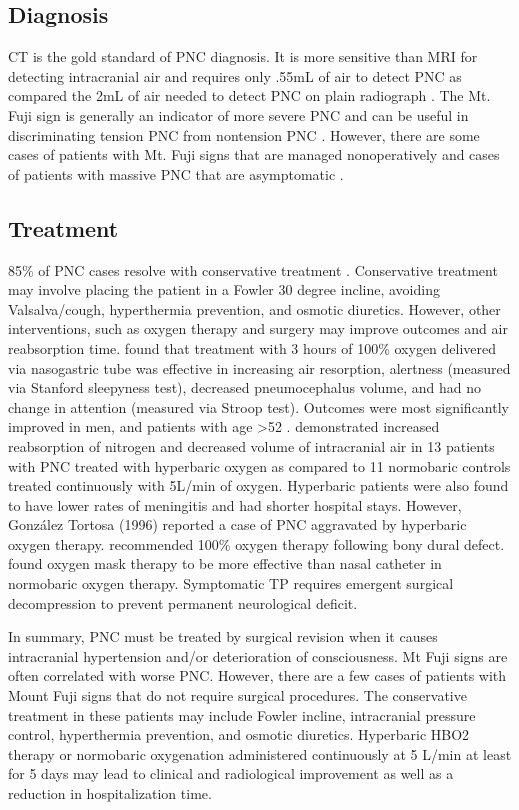 \documentclass[fleqn,10pt]{olplainarticle}
\begin{document}
\subsection*{Diagnosis}
CT is the gold standard of PNC diagnosis. It is more sensitive than MRI for detecting intracranial air and requires only .55mL of air to detect PNC as compared the 2mL of air needed to detect PNC on plain radiograph \citep{pmid24305016}. The Mt. Fuji sign is generally an indicator of more severe PNC and can be useful in discriminating tension PNC from nontension PNC \citep{pmid15286317}. However, there are some cases of patients with Mt. Fuji signs that are managed nonoperatively and cases of patients with massive PNC that are asymptomatic \citep{pmid7142505}.

\subsection*{Treatment}
85\% of PNC cases resolve with conservative treatment \citep{pmid24305016}. Conservative treatment may involve placing the patient in a Fowler 30 degree incline, avoiding Valsalva/cough, hyperthermia prevention, and osmotic diuretics. However, other interventions, such as oxygen therapy and surgery may improve outcomes and air reabsorption time. \cite{pmid25992622} found that treatment with 3 hours of 100\% oxygen delivered via nasogastric tube was effective in increasing air resorption, alertness (measured via Stanford sleepyness test), decreased pneumocephalus volume, and had no change in attention (measured via Stroop test). Outcomes were most significantly improved in men, and patients with age >52 \citep{pmid25992622}. \cite{pmid25328392} demonstrated increased reabsorption of nitrogen and decreased volume of intracranial air in 13 patients with PNC treated with hyperbaric oxygen as compared to 11 normobaric controls treated continuously with 5L/min of oxygen. Hyperbaric patients were also found to have lower rates of meningitis and had shorter hospital stays. However, González Tortosa (1996) reported a case of PNC aggravated by hyperbaric oxygen therapy. \cite{pmid16379134} recommended 100\% oxygen therapy following bony dural defect. \cite{pmid18447708} found oxygen mask therapy to be more effective than nasal catheter in normobaric oxygen therapy. Symptomatic TP requires emergent surgical decompression to prevent permanent neurological deficit.

In summary, PNC  must be treated by surgical revision when it causes intracranial hypertension and/or deterioration of consciousness. Mt Fuji signs are often correlated with worse PNC. However, there are a few cases of patients with Mount Fuji signs that do not require surgical procedures. The conservative treatment in these patients may include Fowler incline, intracranial pressure control, hyperthermia prevention, and osmotic diuretics. Hyperbaric HBO2 therapy or normobaric oxygenation administered continuously at 5 L/min at least for 5 days may lead to clinical and radiological improvement as well as a reduction in hospitalization time.
\end{document}
